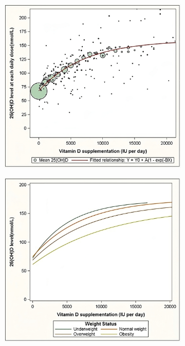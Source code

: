 \documentclass[
  a4paper,
  DIV=11,
  numbers=noendperiod,
  listof=totoc]{scrreprt}
\begin{document}
\begin{figure}
    \centering
    \begin{subfigure}{0.48\textwidth}
        \centering
        \includegraphics[width=\textwidth]{figures/ekwaru-dose-relation-transformed.jpg}
        \label{subfig:vd-dose-response}
    \end{subfigure}
    \hfill
    \begin{subfigure}{0.48\textwidth}
        \centering
        \includegraphics[width=\textwidth]{figures/ekwaru-dose-imc-transformed.jpg}

\end{subfigure}
\end{figure}
\end{document}
